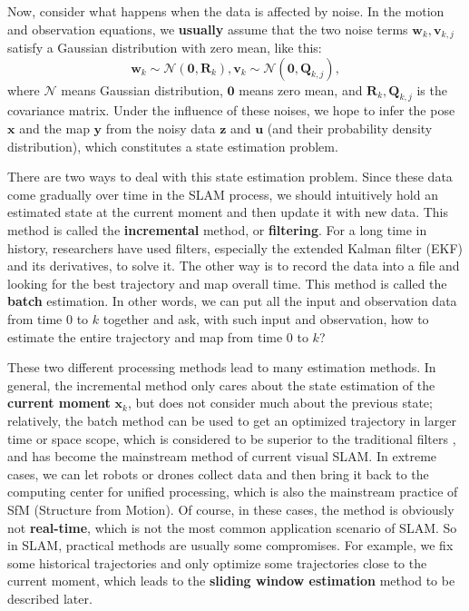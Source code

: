 Now, consider what happens when the data is affected by noise. In the motion and observation equations, we \textbf {usually} assume that the two noise terms $ \mathbf {w} _k, \mathbf {v} _ {k, j} $ satisfy a Gaussian distribution with zero mean, like this:
\begin{equation}
{\mathbf{w}_k} \sim \mathcal{N}\left( {\mathbf{0},{\mathbf{R}_k}} \right),{\mathbf{v}_k} \sim \mathcal{N}\left( {\mathbf{0},{{{\mathbf{Q}}}_{k,j}}} \right),
\end{equation}
where $ \mathcal {N} $ means Gaussian distribution, $ \mathbf{0} $ means zero mean, and $ \mathbf {R} _k, \mathbf {Q} _ {k, j} $ is the covariance matrix. Under the influence of these noises, we hope to infer the pose $ \mathbf {x} $ and the map $ \mathbf {y} $ from the noisy data $ \mathbf {z} $ and $ \mathbf {u} $ (and their probability density distribution), which constitutes a state estimation problem.

There are two ways to deal with this state estimation problem. Since these data come gradually over time in the SLAM process, we should intuitively hold an estimated state at the current moment and then update it with new data. This method is called the \textbf {incremental} method, or \textbf{filtering}. For a long time in history, researchers have used filters, especially the extended Kalman filter (EKF) and its derivatives, to solve it. The other way is to record the data into a file and looking for the best trajectory and map overall time. This method is called the \textbf {batch} estimation. In other words, we can put all the input and observation data from time 0 to $ k $ together and ask, with such input and observation, how to estimate the entire trajectory and map from time 0 to $ k $?

These two different processing methods lead to many estimation methods. In general, the incremental method only cares about the state estimation of the \textbf {current moment} $ \mathbf {x} _k $, but does not consider much about the previous state; relatively, the batch method can be used to get an optimized trajectory in larger time or space scope, which is considered to be superior to the traditional filters \textsuperscript {\cite {Strasdat2012}}, and has become the mainstream method of current visual SLAM. In extreme cases, we can let robots or drones collect data and then bring it back to the computing center for unified processing, which is also the mainstream practice of SfM (Structure from Motion). Of course, in these cases, the method is obviously not \textbf{real-time}, which is not the most common application scenario of SLAM. So in SLAM, practical methods are usually some compromises. For example, we fix some historical trajectories and only optimize some trajectories close to the current moment, which leads to the \textbf{sliding window estimation} method to be described later.

